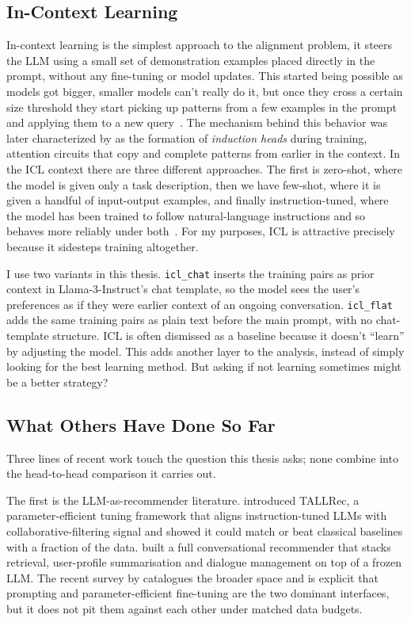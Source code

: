 \subsection{In-Context Learning}

In-context learning is the simplest approach to the alignment problem, it steers the LLM using a small set of demonstration examples placed directly in the prompt, without any fine-tuning or model updates. This started being possible as models got bigger, smaller models can't really do it, but once they cross a certain size threshold they start picking up patterns from a few examples in the prompt and applying them to a new query~\citep{brown2020gpt3}. The mechanism behind this behavior was later characterized by \citet{olsson2022induction} as the formation of \emph{induction heads} during training, attention circuits that copy and complete patterns from earlier in the context. In the ICL context there are three different approaches. The first is zero-shot, where the model is given only a task description, then we have few-shot, where it is given a handful of input-output examples, and finally instruction-tuned, where the model has been trained to follow natural-language instructions and so behaves more reliably under both~\citep{dong2024iclsurvey}. For my purposes, ICL is attractive precisely because it sidesteps training altogether.

I use two variants in this thesis. \texttt{icl\_chat} inserts the training pairs as prior context in Llama-3-Instruct's chat template, so the model sees the user's preferences as if they were earlier context of an ongoing conversation. \texttt{icl\_flat} adds the same training pairs as plain text before the main prompt, with no chat-template structure. ICL is often dismissed as a baseline because it doesn't ``learn'' by adjusting the model. This adds another layer to the analysis, instead of simply looking for the best learning method. But asking if not learning sometimes might be a better strategy?

\subsection{What Others Have Done So Far}
\label{sec:bg:related}

Three lines of recent work touch the question this thesis asks; none combine into the head-to-head comparison it carries out.

The first is the LLM-as-recommender literature. \citet{bao2023tallrec} introduced TALLRec, a parameter-efficient tuning framework that aligns instruction-tuned LLMs with collaborative-filtering signal and showed it could match or beat classical baselines with a fraction of the data. \citet{friedman2023recllm} built a full conversational recommender that stacks retrieval, user-profile summarisation and dialogue management on top of a frozen LLM. The recent survey by \citet{fan2024recllmsurvey} catalogues the broader space and is explicit that prompting and parameter-efficient fine-tuning are the two dominant interfaces, but it does not pit them against each other under matched data budgets.

